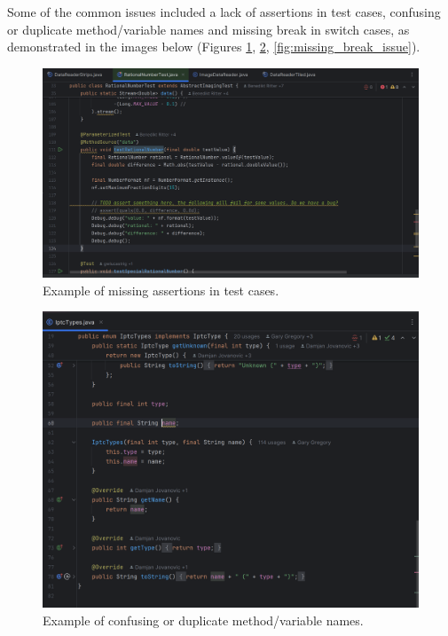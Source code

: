 \documentclass[a4paper,12pt]{report}
\begin{document}
Some of the common issues included a lack of assertions in test cases, confusing or duplicate method/variable names and missing break in switch cases, as demonstrated in the images below (Figures \ref{fig:assertion_issue}, \ref{fig:naming_issue}, \ref{fig:missing_break_issue}).

\begin{figure}[H]
    \centering
    \includegraphics[width=1\textwidth]{Report_Img/assert_issue.png}
    \caption{Example of missing assertions in test cases.}
    \label{fig:assertion_issue}
\end{figure}

\begin{figure}[H]
    \centering
    \includegraphics[width=1\textwidth]{Report_Img/naming_issue.png}
    \caption{Example of confusing or duplicate method/variable names.}
    \label{fig:naming_issue}
\end{figure}
\end{document}
